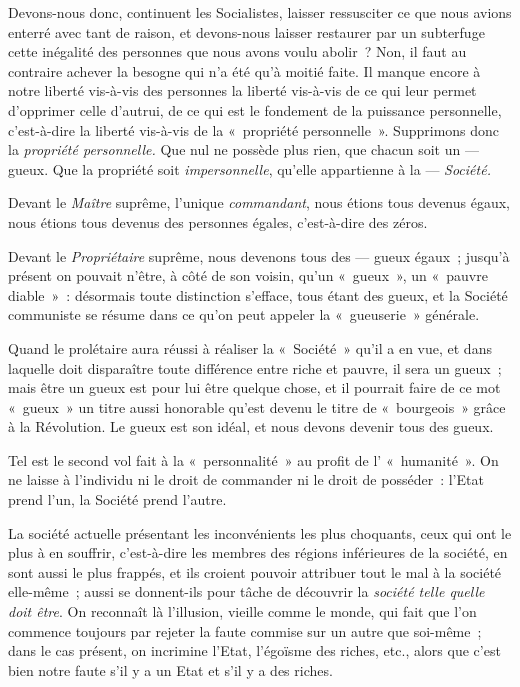 \documentclass[french,twoside]{book} %
\begin{document}
Devons-nous donc, continuent les Socialistes, laisser ressusciter ce que nous avions enterré avec tant de raison, et devons-nous laisser restaurer par  un subterfuge cette inégalité des personnes que nous avons voulu abolir ? Non, il faut au contraire achever la besogne qui n’a été qu’à moitié faite. Il manque encore à notre liberté vis-à-vis des personnes la liberté vis-à-vis de ce qui leur permet d’opprimer celle d’autrui, de ce qui est le fondement de la puissance personnelle, c’est-à-dire la liberté vis-à-vis de la « propriété personnelle ». Supprimons donc la \emph{propriété personnelle.} Que nul ne possède plus rien, que chacun soit un — gueux. Que la propriété soit \emph{impersonnelle}, qu’elle appartienne à la — \emph{Société.}\par
Devant le \emph{Maître} suprême, l’unique \emph{commandant}, nous étions tous devenus égaux, nous étions tous devenus des personnes égales, c’est-à-dire des zéros.\par
Devant le \emph{Propriétaire} suprême, nous devenons tous des — gueux égaux ; jusqu’à présent on pouvait n’être, à côté de son voisin, qu’un « gueux », un « pauvre diable » : désormais toute distinction s’efface, tous étant des gueux, et la Société communiste se résume dans ce qu’on peut appeler la « gueuserie » générale.\par
Quand le prolétaire aura réussi à réaliser la « Société » qu’il a en vue, et dans laquelle doit disparaître toute différence entre riche et pauvre, il sera un gueux ; mais être un gueux est pour lui être quelque chose, et il pourrait faire de ce mot « gueux » un titre aussi honorable qu’est devenu le titre de « bourgeois » grâce à la Révolution. Le gueux est son idéal, et nous devons devenir tous des gueux.\par
Tel est le second vol fait à la « personnalité » au profit de l’ « humanité ». On ne laisse à l’individu ni le droit de commander ni le droit de posséder : l’Etat prend l’un, la Société prend l’autre.\par
La société actuelle présentant les inconvénients les plus choquants, ceux qui ont le plus à en souffrir, c’est-à-dire les membres des régions inférieures de la société, en sont aussi le plus frappés, et ils croient pouvoir attribuer tout le mal à la société elle-même ;  aussi se donnent-ils pour tâche de découvrir la \emph{société telle quelle doit être}. On reconnaît là l’illusion, vieille comme le monde, qui fait que l’on commence toujours par rejeter la faute commise sur un autre que soi-même ; dans le cas présent, on incrimine l’Etat, l’égoïsme des riches, etc., alors que c’est bien notre faute s’il y a un Etat et s’il y a des riches.\par
\end{document}
